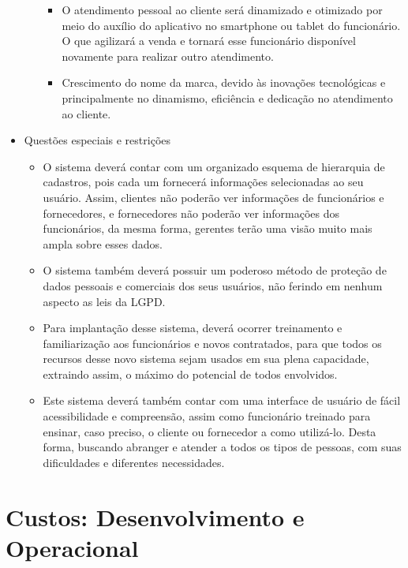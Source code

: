 \begin{itemize}
\begin{itemize}
\begin{itemize}
		\item O atendimento pessoal ao cliente será dinamizado e otimizado por meio do auxílio do aplicativo no smartphone ou
	tablet do funcionário. O que agilizará a venda e tornará esse funcionário disponível novamente para realizar outro atendimento.
		\item Crescimento do nome da marca, devido às inovações tecnológicas e principalmente no dinamismo, eficiência e
	dedicação no atendimento ao cliente.
		\end{itemize}
	\end{itemize}
\item Questões especiais e restrições
	\begin{itemize}
	\item O sistema deverá contar com um organizado esquema de hierarquia de cadastros, pois cada um fornecerá informações selecionadas ao seu usuário. Assim, clientes não poderão ver informações de funcionários e fornecedores, e fornecedores não poderão ver informações dos funcionários, da mesma forma, gerentes terão uma visão muito mais ampla sobre esses dados.
	 \item O sistema também deverá possuir um poderoso método de proteção de dados pessoais e comerciais dos seus usuários, não ferindo em nenhum aspecto as leis da LGPD.
	\item Para implantação desse sistema, deverá ocorrer treinamento e familiarização aos funcionários e novos contratados, para que todos os recursos desse novo sistema sejam usados em sua plena capacidade, extraindo assim, o máximo do potencial de todos envolvidos.
	\item Este sistema deverá também contar com uma interface de usuário de fácil acessibilidade e compreensão, assim como funcionário treinado para ensinar, caso preciso, o cliente ou fornecedor a como utilizá-lo. Desta forma, buscando abranger e atender a todos os tipos de pessoas, com suas dificuldades e diferentes necessidades.
	\end{itemize}
\end{itemize}

\section{Custos: Desenvolvimento e Operacional}

